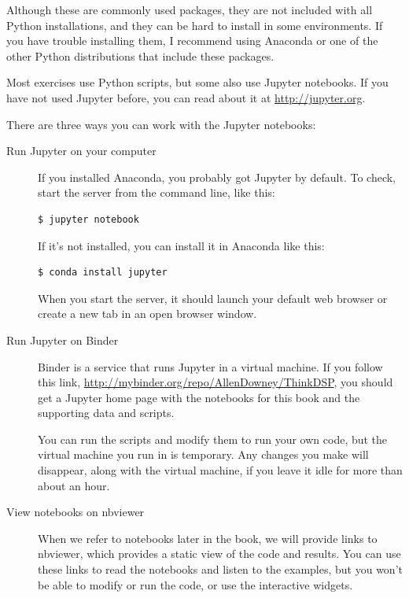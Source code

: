 \documentclass[12pt]{book}
\begin{document}
Although these are commonly used packages, they are not included with
all Python installations, and they can be hard to install in some
environments.  If you have trouble installing them, I
recommend using Anaconda or one of the other Python distributions
that include these packages.

Most exercises use Python scripts, but some also use Jupyter
notebooks.  If you have not used Jupyter before, you can read about
it at \url{http://jupyter.org}.

There are three ways you can work with the Jupyter notebooks:

\begin{description}

\item[Run Jupyter on your computer]

If you installed Anaconda, you
  probably got Jupyter by default.  To check, start the server from
the command line, like this:

\begin{verbatim}
$ jupyter notebook
\end{verbatim}

If it's not installed, you can install it in Anaconda like this:

\begin{verbatim}
$ conda install jupyter
\end{verbatim}

When you start the server, it should launch your default web browser
or create a new tab in an open browser window.

\item[Run Jupyter on Binder]

Binder is a service that runs Jupyter in a virtual machine.  If you
follow this link, \url{http://mybinder.org/repo/AllenDowney/ThinkDSP},
you should get a Jupyter home page with the notebooks for this book
and the supporting data and scripts.

You can run the scripts and modify them to run your own code, but the
virtual machine you run in is temporary.  Any changes you make will
disappear, along with the virtual machine, if you leave it idle for
more than about an hour.

\item[View notebooks on nbviewer]

When we refer to notebooks later in the book, we will provide links to
nbviewer, which provides a static view of the code and results.  You
can use these links to read the notebooks and listen to the examples,
but you won't be able to modify or run the code, or use the
interactive widgets.

\end{description}
\end{document}
